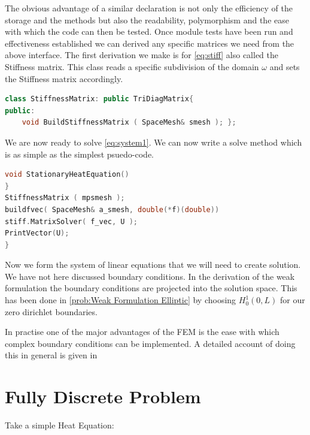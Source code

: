 \documentclass{uonmathreport}
\theoremstyle{definition}
\theoremstyle{problem}
\theoremstyle{theorem}
\begin{document}
The obvious advantage of a similar declaration is not only the efficiency of the storage and the methods but also the readability, polymorphism and the ease with which the code can then be tested. Once module tests have been run and effectiveness established we can derived any specific matrices we need from the above interface. The first derivation we make is for \ref{eq:stiff} also called the Stiffness matrix. This class reads a specific subdivision of the domain $\omega$ and sets the Stiffness matrix accordingly.

\begin{lstlisting}[language=C++]
class StiffnessMatrix: public TriDiagMatrix{
public:
    void BuildStiffnessMatrix ( SpaceMesh& smesh ); };

\end{lstlisting}

We are now ready to solve \ref{eq:system1}. We can now write a solve method which is as simple as the simplest psuedo-code. \\

\begin{lstlisting}[language=C++]
void StationaryHeatEquation()
}
StiffnessMatrix ( mpsmesh );
buildfvec( SpaceMesh& a_smesh, double(*f)(double))
stiff.MatrixSolver( f_vec, U );
PrintVector(U);
}
\end{lstlisting} 

Now we form the system of linear equations that we will need to create solution. We have not here discussed boundary conditions. In the derivation of the weak formulation the boundary conditions are projected into the solution space. This has been done in \ref{prob:Weak Formulation Elliptic} by choosing $H^1_0(0, L)$ for our zero dirichlet boundaries. 



In practise one of the major advantages of the FEM is the ease with which complex boundary conditions can be implemented. A detailed account of doing this in general is given in \cite{larson2013finite} 



\clearpage

\section{Fully Discrete Problem} \label{sec:Fully Discrete}



Take a simple Heat Equation:
\end{document}
